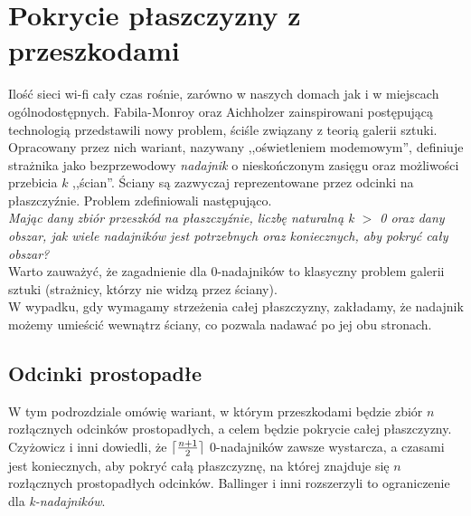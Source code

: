 \documentclass[brudnopis]{xmgr}
\DeclarePairedDelimiter\ceil{\lceil}{\rceil}
\theoremstyle{definition}
\begin{document}
\section{Pokrycie płaszczyzny z przeszkodami}
	Ilość sieci wi-fi cały czas rośnie, zarówno w naszych domach jak i w miejscach ogólnodostępnych. Fabila-Monroy oraz Aichholzer \cite{fabilamonroy} zainspirowani postępującą technologią przedstawili nowy problem, ściśle związany z teorią galerii sztuki. Opracowany przez nich wariant, nazywany ,,oświetleniem modemowym'', definiuje strażnika jako bezprzewodowy \emph{nadajnik} o nieskończonym zasięgu oraz możliwości przebicia $k$ ,,ścian''. Ściany są zazwyczaj reprezentowane przez odcinki na płaszczyźnie. Problem zdefiniowali następująco.
\\\indent \emph{Mając dany zbiór przeszkód na płaszczyźnie, liczbę naturalną k $>$ 0 oraz dany obszar, jak wiele  nadajników jest potrzebnych oraz koniecznych, aby pokryć cały obszar?}  
\\\indent Warto zauważyć, że zagadnienie dla 0-nadajników to klasyczny problem galerii sztuki (strażnicy, którzy nie widzą przez ściany).
\\W wypadku, gdy wymagamy strzeżenia całej płaszczyzny, zakładamy, że nadajnik możemy umieścić wewnątrz ściany, co pozwala nadawać po jej obu stronach.
\subsection{Odcinki prostopadłe}
W tym podrozdziale omówię wariant, w którym przeszkodami będzie zbiór $n$ rozłącznych odcinków prostopadłych, a celem będzie pokrycie całej płaszczyzny. Czyżowicz i inni \cite{czyzowicz} dowiedli, że $\ceil{\frac{n+1}{2}}$ 0-nadajników zawsze wystarcza, a czasami jest koniecznych, aby pokryć całą płaszczyznę, na której znajduje się $n$ rozłącznych prostopadłych odcinków. Ballinger i inni \cite{knadajniki} rozszerzyli to ograniczenie dla \emph{k-nadajników}.
\end{document}
